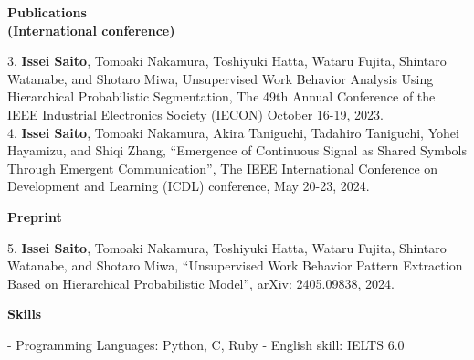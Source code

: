 \documentclass[a4paper,10pt]{article}
\begin{document}
\vspace{10pt}

\noindent
\begin{minipage}[t]{0.3\textwidth}
    \textbf{Publications \\(International conference)}
\end{minipage}%
\begin{minipage}[t]{0.7\textwidth}
    3. \textbf{Issei Saito}, Tomoaki Nakamura, Toshiyuki Hatta, Wataru Fujita, Shintaro Watanabe, and Shotaro Miwa, Unsupervised Work Behavior Analysis Using Hierarchical Probabilistic Segmentation, The 49th Annual Conference of the IEEE Industrial Electronics Society (IECON) October 16-19, 2023.  \newline \\
    4. \textbf{Issei Saito}, Tomoaki Nakamura, Akira Taniguchi, Tadahiro Taniguchi, Yohei Hayamizu, and Shiqi Zhang, “Emergence of Continuous Signal as Shared Symbols Through Emergent Communication”, The IEEE International Conference on Development and Learning (ICDL) conference, May 20-23, 2024.
\end{minipage}

\vspace{10pt}

\noindent
\begin{minipage}[t]{0.3\textwidth}
    \textbf{Preprint}
\end{minipage}%
\begin{minipage}[t]{0.7\textwidth}
    5. \textbf{Issei Saito}, Tomoaki Nakamura, Toshiyuki Hatta, Wataru Fujita, Shintaro Watanabe, and Shotaro Miwa, “Unsupervised Work Behavior Pattern Extraction Based on Hierarchical Probabilistic Model”, arXiv: 2405.09838, 2024.
\end{minipage}

\vspace{10pt}

\noindent
\begin{minipage}[t]{0.3\textwidth}
    \textbf{Skills}
\end{minipage}%
\begin{minipage}[t]{0.7\textwidth}
    - Programming Languages: Python, C, Ruby \newline
    - English skill: IELTS 6.0
\end{minipage}

\vspace{10pt}
\end{document}
